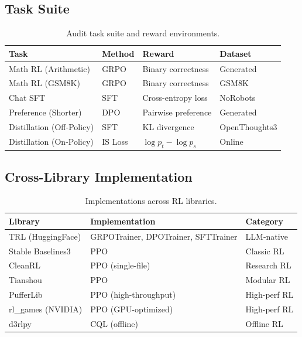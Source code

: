 
\subsection{Task Suite}

\begin{table}[htbp]
\centering
\caption{Audit task suite and reward environments.}
\label{tab:tasks}
\begin{tabular}{llll}
\toprule
\textbf{Task} & \textbf{Method} & \textbf{Reward} & \textbf{Dataset} \\
\midrule
Math RL (Arithmetic) & GRPO & Binary correctness & Generated \\
Math RL (GSM8K) & GRPO & Binary correctness & GSM8K \\
Chat SFT & SFT & Cross-entropy loss & NoRobots \\
Preference (Shorter) & DPO & Pairwise preference & Generated \\
Distillation (Off-Policy) & SFT & KL divergence & OpenThoughts3 \\
Distillation (On-Policy) & IS Loss & $\log p_t - \log p_s$ & Online \\
\bottomrule
\end{tabular}
\end{table}

\subsection{Cross-Library Implementation}

\begin{table}[htbp]
\centering
\caption{Implementations across RL libraries.}
\label{tab:implementations}
\begin{tabular}{lll}
\toprule
\textbf{Library} & \textbf{Implementation} & \textbf{Category} \\
\midrule
TRL (HuggingFace) & GRPOTrainer, DPOTrainer, SFTTrainer & LLM-native \\
Stable Baselines3 & PPO & Classic RL \\
CleanRL & PPO (single-file) & Research RL \\
Tianshou & PPO & Modular RL \\
PufferLib & PPO (high-throughput) & High-perf RL \\
rl\_games (NVIDIA) & PPO (GPU-optimized) & High-perf RL \\
d3rlpy & CQL (offline) & Offline RL \\
\bottomrule
\end{tabular}
\end{table}

